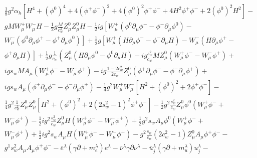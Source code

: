 \documentclass[lang=cn,newtx,10pt,scheme=chinese,thmcnt=section]{elegantbook}
\begin{document}
\begin{equation}
\begin{aligned}
		&\frac{1}{8} g^{2} \alpha_{h}\left[H^{4}+\left(\phi^{0}\right)^{4}+4\left(\phi^{+} \phi^{-}\right)^{2}+4\left(\phi^{0}\right)^{2} \phi^{+} \phi^{-}+4 H^{2} \phi^{+} \phi^{-}+2\left(\phi^{0}\right)^{2} H^{2}\right]-\\
		&g M W_{\mu}^{+} W_{\mu}^{-} H-\frac{1}{2} g \frac{M}{c_{w}^{2}} Z_{\mu}^{0} Z_{\mu}^{0} H-\frac{1}{2} i g\left[W_{\mu}^{+}\left(\phi^{0} \partial_{\mu} \phi^{-}-\phi^{-} \partial_{\mu} \phi^{0}\right)-\right.\\
		&\left.W_{\mu}^{-}\left(\phi^{0} \partial_{\mu} \phi^{+}-\phi^{+} \partial_{\mu} \phi^{0}\right)\right]+\frac{1}{2} g\left[W_{\mu}^{+}\left(H \partial_{\mu} \phi^{-}-\phi^{-} \partial_{\mu} H\right)-W_{\mu}^{-}\left(H \partial_{\mu} \phi^{+}-\right.\right.\\
		&\left.\left.\phi^{+} \partial_{\mu} H\right)\right]+\frac{1}{2} g \frac{1}{c_{w}}\left(Z_{\mu}^{0}\left(H \partial_{\mu} \phi^{0}-\phi^{0} \partial_{\mu} H\right)-i g_{c_{w}}^{s_{w}^{2}} M Z_{\mu}^{0}\left(W_{\mu}^{+} \phi^{-}-W_{\mu}^{-} \phi^{+}\right)+\right.\\
		&i g s_{w} M A_{\mu}\left(W_{\mu}^{+} \phi^{-}-W_{\mu}^{-} \phi^{+}\right)-i g \frac{1-2 c_{w}^{2}}{2 c_{w}} Z_{\mu}^{0}\left(\phi^{+} \partial_{\mu} \phi^{-}-\phi^{-} \partial_{\mu} \phi^{+}\right)+\\
		&igs_{w} A_{\mu}\left(\phi^{+} \partial_{\mu} \phi^{-}-\phi^{-} \partial_{\mu} \phi^{+}\right)-\frac{1}{4} g^{2} W_{\mu}^{+} W_{\mu}^{-}\left[H^{2}+\left(\phi^{0}\right)^{2}+2 \phi^{+} \phi^{-}\right]-\\
		&\frac{1}{4} g^{2} \frac{1}{c_{w}^{2}} Z_{\mu}^{0} Z_{\mu}^{0}\left[H^{2}+\left(\phi^{0}\right)^{2}+2\left(2 s_{w}^{2}-1\right)^{2} \phi^{+} \phi^{-}\right]-\frac{1}{2} g^{2} \frac{s_{w}^{2}}{c_{w}} Z_{\mu}^{0} \phi^{0}\left(W_{\mu}^{+} \phi^{-}+\right.\\
		&\left.W_{\mu}^{-} \phi^{+}\right)-\frac{1}{2} i g^{2} \frac{s_{w}^{2}}{c_{w}} Z_{\mu}^{0} H\left(W_{\mu}^{+} \phi^{-}-W_{\mu}^{-} \phi^{+}\right)+\frac{1}{2} g^{2} s_{w} A_{\mu} \phi^{0}\left(W_{\mu}^{+} \phi^{-}+\right.\\
		&\left.W_{\mu}^{-} \phi^{+}\right)+\frac{1}{2} i g^{2} s_{w} A_{\mu} H\left(W_{\mu}^{+} \phi^{-}-W_{\mu}^{-} \phi^{+}\right)-g^{2} \frac{s_{w}}{c_{w}}\left(2 c_{w}^{2}-1\right) Z_{\mu}^{0} A_{\mu} \phi^{+} \phi^{-}-\\
		&g^{1} s_{w}^{2} A_{\mu} A_{\mu} \phi^{+} \phi^{-}-\bar{e}^{\lambda}\left(\gamma \partial+m_{e}^{\lambda}\right) e^{\lambda}-\bar{\nu}^{\lambda} \gamma \partial \nu^{\lambda}-\bar{u}_{j}^{\lambda}\left(\gamma \partial+m_{u}^{\lambda}\right) u_{j}^{\lambda}-\\

\end{aligned}
\end{equation}
\end{document}
